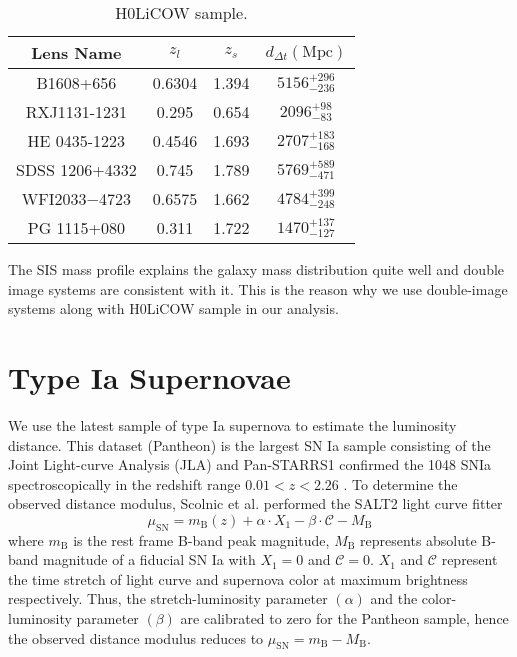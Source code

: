\documentclass[12pt]{report}
\begin{document}
\begin{table}[H]
\centering
\begin{large}
     \begin{tabular}[b]{| c | c |c| c|}\hline
       Lens Name & $z_l$ & $z_s$ & $d_{\Delta t}(\mathrm{Mpc})$\\ \hline \hline
    B1608+656 & 0.6304 & 1.394        &$5156_{-236}^{+296}$  \\ \hline
    RXJ1131-1231 & 0.295 & 0.654   & $2096_{-83}^{+98}$ \\ \hline
    HE 0435-1223 & 0.4546 & 1.693   & $2707_{-168}^{+183}$ \\ \hline
    SDSS 1206+4332 & 0.745 & 1.789  & $5769_{-471}^{+589}$  \\ \hline
    WFI2033−4723 & 0.6575 & 1.662    &  $4784_{-248}^{+399}$\\ \hline
    PG 1115+080 & 0.311 & 1.722            & $1470_{-127}^{+137}$ \\ \hline
    \end{tabular}
\end{large}
\caption{ H0LiCOW sample. }
\label{tb:a1}
\end{table}





The SIS mass profile explains the galaxy mass distribution quite well \cite{dp2009} and double image systems are consistent with it. This is the reason why we use  double-image systems along with H0LiCOW sample in our analysis.

\section{Type Ia Supernovae}
We use the latest sample of type Ia supernova to estimate the luminosity distance. This dataset (Pantheon) is the largest SN Ia sample consisting of the Joint Light-curve Analysis (JLA) and Pan-STARRS1 confirmed the 1048 SNIa spectroscopically in the redshift range  $0.01<z<2.26$ \cite{dm2018}. To determine the observed distance modulus, Scolnic et al.  \cite{dm2018} performed the SALT2 \cite{jg2010} light curve fitter
$$
\mu_{\mathrm{SN}}=m_{\mathrm{B}}(z)+\alpha \cdot X_{1}-\beta \cdot {\mathcal{C}}-M_{\mathrm{B}}
$$
where $m_{\mathrm{B}}$ is the rest frame B-band peak magnitude, $M_{\mathrm{B}}$ represents absolute B-band magnitude of a fiducial SN Ia with $X_1 =0$ and ${\mathcal{C}}=0$. $X_1$ and ${\mathcal{C}}$ represent the time stretch of light curve and  supernova color at maximum brightness respectively. Thus, the stretch-luminosity parameter $(\alpha)$ and the color-luminosity parameter $(\beta)$ are calibrated to zero for the Pantheon sample, hence the observed distance modulus reduces to $\mu_{\mathrm{SN}}=m_{\mathrm{B}}-M_{\mathrm{B}}$. \\
\end{document}
